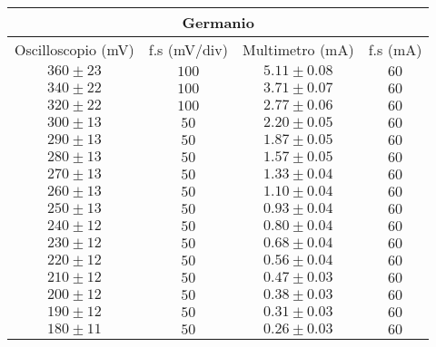 \documentclass[@MAIN@]{subfile}
\begin{document}
    \begin{tabular}{ ||c|c|c|c|| }
        \hline
        \multicolumn{4}{||c||}{Germanio} \\
        \hline
        Oscilloscopio (mV) & f.s (mV/div) & Multimetro (mA) & f.s (mA) \\
        \hline
        $360\pm 23$        & $100$                & $5.11\pm 0.08$  & $60$             \\
        \hline
        $340\pm 22$        & $100$                & $3.71\pm 0.07$  & $60$             \\
        \hline
        $320\pm 22$        & $100$                & $2.77\pm 0.06$  & $60$             \\
        \hline
        $300\pm 13$        & $50$                 & $2.20\pm 0.05$  & $60$             \\
        \hline
        $290\pm 13$        & $50$                 & $1.87\pm 0.05$  & $60$             \\
        \hline
        $280\pm 13$        & $50$                 & $1.57\pm 0.05$  & $60$             \\
        \hline
        $270\pm 13$        & $50$                 & $1.33\pm 0.04$  & $60$             \\
        \hline
        $260\pm 13$        & $50$                 & $1.10\pm 0.04$  & $60$             \\
        \hline
        $250\pm 13$        & $50$                 & $0.93\pm 0.04$  & $60$             \\
        \hline
        $240\pm 12$        & $50$                 & $0.80\pm 0.04$  & $60$             \\
        \hline
        $230\pm 12$        & $50$                 & $0.68\pm 0.04$  & $60$             \\
        \hline
        $220\pm 12$        & $50$                 & $0.56\pm 0.04$  & $60$             \\
        \hline
        $210\pm 12$        & $50$                 & $0.47\pm 0.03$  & $60$             \\
        \hline
        $200\pm 12$        & $50$                 & $0.38\pm 0.03$  & $60$             \\
        \hline
        $190\pm 12$        & $50$                 & $0.31\pm 0.03$  & $60$             \\
        \hline
        $180\pm 11$        & $50$                 & $0.26\pm 0.03$  & $60$             \\

\end{tabular}
\end{document}
